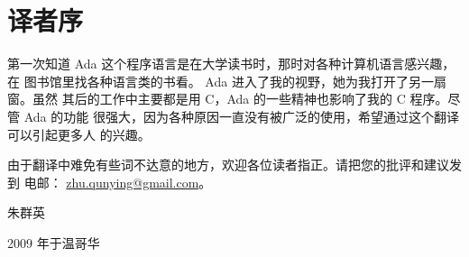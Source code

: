 %
%
%

\chapter{译者序}
\pagestyle{empty}

第一次知道 Ada 这个程序语言是在大学读书时，那时对各种计算机语言感兴趣，在
图书馆里找各种语言类的书看。 Ada 进入了我的视野，她为我打开了另一扇窗。虽然
其后的工作中主要都是用 C，Ada 的一些精神也影响了我的 C 程序。尽管 Ada 的功能
很强大，因为各种原因一直没有被广泛的使用，希望通过这个翻译可以引起更多人
的兴趣。

 
由于翻译中难免有些词不达意的地方，欢迎各位读者指正。请把您的批评和建议发到
电邮： \url{zhu.qunying@gmail.com}。


\vspace{5em}
\begin{flushright}
朱群英

2009 年于温哥华
\end{flushright}


